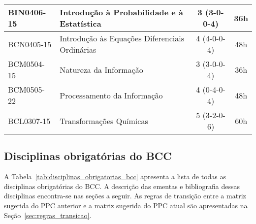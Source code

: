 \begin{table}[h!]
\begin{tabular}{|l|p{}|c|c|}
        BIN0406-15 & Introdução à Probabilidade e à Estatística & 3 (3-0-0-4) & 36h\\
        \hline
        BCN0405-15 & Introdução às Equações Diferenciais Ordinárias & 4 (4-0-0-4) & 48h \\
        \hline
        BCM0504-15 & Natureza da Informação & 3 (3-0-0-4) & 36h\\
        \hline
        BCM0505-22 & Processamento da Informação & 4 (0-4-0-4) & 48h\\
        \hline
        BCL0307-15 & Transformações Químicas & 5 (3-2-0-6) & 60h\\
        \hline
    \end{tabular}
\end{table}


\subsection{Disciplinas obrigatórias do BCC}
\label{sec:disciplinas_obrigatorais_ementas}

A Tabela~\ref{tab:disciplinas_obrigatorias_bcc} apresenta a lista de todas as
disciplinas obrigatórias do BCC.
A descrição das ementas e bibliografia dessas disciplinas encontra-se nas
seções a seguir.
As regras de transição entre a matriz sugerida do PPC anterior e a matriz
sugerida do PPC atual são apresentadas na Seção~\ref{sec:regras_transicao}.


